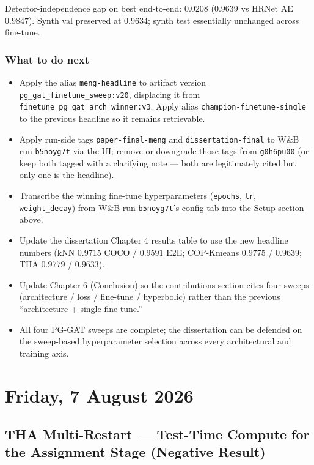 \vspace{0.5em}

Detector-independence gap on best end-to-end: $0.0208$ ($0.9639$ vs HRNet AE $0.9847$).
Synth val preserved at $0.9634$; synth test essentially unchanged across fine-tune.

\subsubsection{What to do next}

\begin{itemize}
    \item Apply the alias \texttt{meng-headline} to artifact version \texttt{pg\_gat\_finetune\_sweep:v20}, displacing it from \texttt{finetune\_pg\_gat\_arch\_winner:v3}. Apply alias \texttt{champion-finetune-single} to the previous headline so it remains retrievable.
    \item Apply run-side tags \texttt{paper-final-meng} and \texttt{dissertation-final} to W\&B run \texttt{b5noyg7t} via the UI; remove or downgrade those tags from \texttt{g0h6pu00} (or keep both tagged with a clarifying note --- both are legitimately cited but only one is the headline).
    \item Transcribe the winning fine-tune hyperparameters (\texttt{epochs}, \texttt{lr}, \texttt{weight\_decay}) from W\&B run \texttt{b5noyg7t}'s config tab into the Setup section above.
    \item Update the dissertation Chapter 4 results table to use the new headline numbers (kNN $0.9715$ COCO / $0.9591$ E2E; COP-Kmeans $0.9775$ / $0.9639$; THA $0.9779$ / $0.9633$).
    \item Update Chapter 6 (Conclusion) so the contributions section cites four sweeps (architecture / loss / fine-tune / hyperbolic) rather than the previous ``architecture + single fine-tune.''
    \item All four PG-GAT sweeps are complete; the dissertation can be defended on the sweep-based hyperparameter selection across every architectural and training axis.
\end{itemize}



\section[2026/08/07]{Friday, 7 August 2026}

\subsection{THA Multi-Restart --- Test-Time Compute for the Assignment Stage (Negative Result)}

